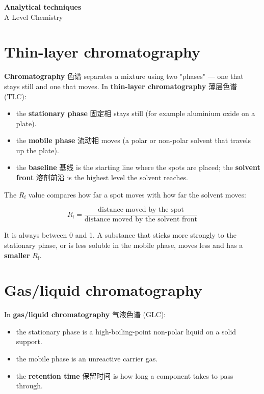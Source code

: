 \documentclass[11pt]{article}
\begin{document}
\begin{center}
  {\LARGE\bfseries Analytical techniques}\\[0.35em]
  {\large A Level Chemistry}
\end{center}
\vspace{0.6em}

\section*{Thin-layer chromatography}

\textbf{Chromatography} 色谱 separates a mixture using two "phases" — one that stays still and one that moves. In \textbf{thin-layer chromatography} 薄层色谱 (TLC):

\begin{itemize}
\item the \textbf{stationary phase} 固定相 stays still (for example aluminium oxide on a plate).

\item the \textbf{mobile phase} 流动相 moves (a polar or non-polar solvent that travels up the plate).

\item the \textbf{baseline} 基线 is the starting line where the spots are placed; the \textbf{solvent front} 溶剂前沿 is the highest level the solvent reaches.

\end{itemize}

The $R_{\text{f}}$ value compares how far a spot moves with how far the solvent moves:

\[
R_{\text{f}} = \frac{\text{distance moved by the spot}}{\text{distance moved by the solvent front}}
\]

It is always between 0 and 1. A substance that sticks more strongly to the stationary phase, or is less soluble in the mobile phase, moves less and has a \textbf{smaller} $R_{\text{f}}$.

\section*{Gas/liquid chromatography}

In \textbf{gas/liquid chromatography} 气液色谱 (GLC):

\begin{itemize}
\item the stationary phase is a high-boiling-point non-polar liquid on a solid support.

\item the mobile phase is an unreactive carrier gas.

\item the \textbf{retention time} 保留时间 is how long a component takes to pass through.

\end{itemize}
\end{document}
